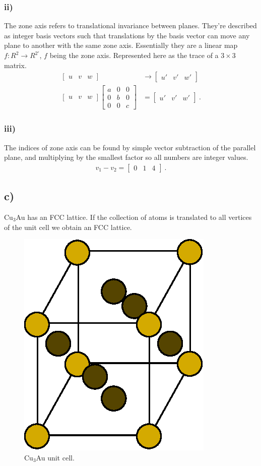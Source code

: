 \documentclass[a4paper]{article}
\begin{document}
	\subsubsection{ii)}
	The zone axis refers to translational invariance between planes. They're described as integer basis vectors such that translations by the basis vector can move any plane to another with the same zone axis. Essentially they are a linear map $f: R^{2} \to R^{2'}$, $f$ being the zone axis. Represented here as the trace of a $3\times3$ matrix.
	\begin{align}
		\begin{bmatrix}
		u & v & w
		\end{bmatrix} &\to 
		\begin{bmatrix}
		u' & v' & w'
		\end{bmatrix}\\
		\begin{bmatrix}
		u & v & w
		\end{bmatrix}
		\begin{bmatrix}
		a & 0 & 0\\
		0 & b & 0 \\
		0 & 0 & c
		\end{bmatrix}
		&=
		\begin{bmatrix}
		u' & v' & w'
		\end{bmatrix}~.
	\end{align}
	\subsubsection{iii)}
	The indices of zone axis can be found by simple vector subtraction of the parallel plane, and multiplying by the smallest factor so all numbers are integer values.
	\begin{align}
		v_{1} - v_{2} = 
		\begin{bmatrix}
		0 & 1 & 4
		\end{bmatrix}~.
	\end{align}
	
	\subsection{c)}
	Cu$_{3}$Au has an FCC lattice. If the collection of atoms is translated to all vertices of the unit cell we obtain an FCC lattice.
	\begin{figure}
		\centering
		\includegraphics[width=0.33\linewidth]{cu3au.eps}
		\caption{Cu$_{3}$Au unit cell.}
	\end{figure}
\end{document}
